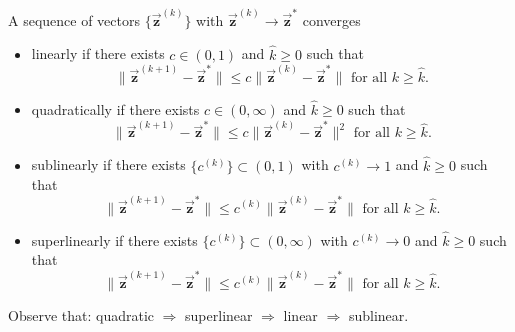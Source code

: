 \documentclass[9pt, headings=standardclasses, parskip=half]{scrartcl}
\renewcommand{\emph}[1]{\textcolor{mypurple}{#1}}
\newcommand{\vect}[1]{\vec{\boldsymbol{#1}}}
\begin{document}
\begin{definition}
\label{def:convergence_rates}
A sequence of vectors \(\{\vect{z}^{(k)}\}\) with \(\vect{z}^{(k)} \to \vect{z}^{*}\) converges
\begin{itemize}
  \item \emph{linearly} if there exists \(c \in (0,1)\) and \(\hat{k} \geq 0\) such that 
  \[
  \|\vect{z}^{(k+1)}-\vect{z}^{*}\| \leq c\|\vect{z}^{(k)}-\vect{z}^{*}\| \text{ for all } k \geq \hat{k} \text{.}
  \]
  \item \emph{quadratically} if there exists \(c \in (0,\infty)\) and \(\hat{k} \geq 0\) such that
  \[
  \|\vect{z}^{(k+1)}-\vect{z}^{*}\| \leq c\|\vect{z}^{(k)}-\vect{z}^{*}\|^{2} \text{ for all } k \geq \hat{k} \text{.}
  \]
  \item \emph{sublinearly} if there exists \(\{c^{(k)}\} \subset (0,1)\) with \(c^{(k)} \to 1\) and \(\hat{k} \geq 0\) such that
  \[
  \|\vect{z}^{(k+1)}-\vect{z}^{*}\| \leq c^{(k)}\|\vect{z}^{(k)}-\vect{z}^{*}\| \text{ for all } k \geq \hat{k} \text{.}
  \]
  \item \emph{superlinearly} if there exists \(\{c^{(k)}\} \subset (0,\infty)\) with \(c^{(k)} \to 0\) and \(\hat{k} \geq 0\) such that
  \[
  \|\vect{z}^{(k+1)}-\vect{z}^{*}\| \leq c^{(k)}\|\vect{z}^{(k)}-\vect{z}^{*}\| \text{ for all } k \geq \hat{k} \text{.}
  \]
\end{itemize}
\end{definition}

\begin{remark}
Observe that: quadratic \(\Longrightarrow\) superlinear \(\Longrightarrow\) linear \(\Longrightarrow\) sublinear.
\end{remark}
\end{document}
